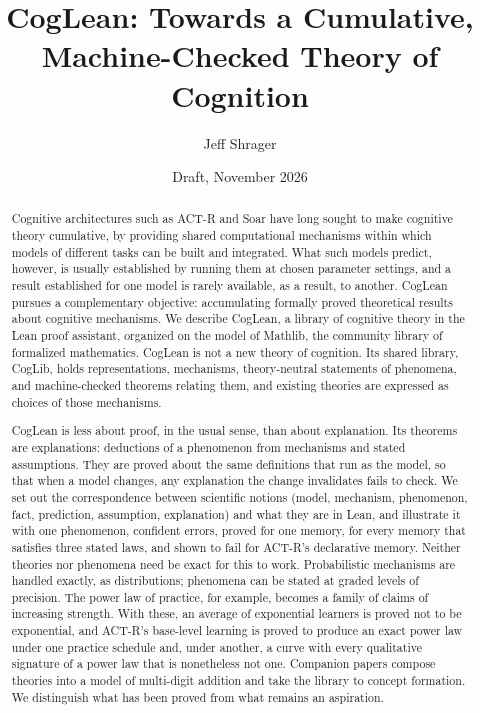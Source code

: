 \documentclass[11pt]{article}
\title{CogLean: Towards a Cumulative, Machine-Checked Theory of Cognition}
\author{Jeff Shrager}
\date{Draft, November 2026}
\begin{document}
\sloppy
\maketitle

\begin{center}
\end{center}
\medskip

\begin{abstract}
Cognitive architectures such as ACT-R and Soar have long sought to make cognitive theory cumulative, by providing shared computational mechanisms within which models of different tasks can be built and integrated. What such models predict, however, is usually established by running them at chosen parameter settings, and a result established for one model is rarely available, as a result, to another. CogLean pursues a complementary objective: accumulating formally proved theoretical results about cognitive mechanisms. We describe CogLean, a library of cognitive theory in the Lean proof assistant, organized on the model of Mathlib, the community library of formalized mathematics. CogLean is not a new theory of cognition. Its shared library, CogLib, holds representations, mechanisms, theory-neutral statements of phenomena, and machine-checked theorems relating them, and existing theories are expressed as choices of those mechanisms.

CogLean is less about proof, in the usual sense, than about explanation. Its theorems are explanations: deductions of a phenomenon from mechanisms and stated assumptions. They are proved about the same definitions that run as the model, so that when a model changes, any explanation the change invalidates fails to check. We set out the correspondence between scientific notions (model, mechanism, phenomenon, fact, prediction, assumption, explanation) and what they are in Lean, and illustrate it with one phenomenon, confident errors, proved for one memory, for every memory that satisfies three stated laws, and shown to fail for ACT-R's declarative memory. Neither theories nor phenomena need be exact for this to work. Probabilistic mechanisms are handled exactly, as distributions; phenomena can be stated at graded levels of precision. The power law of practice, for example, becomes a family of claims of increasing strength. With these, an average of exponential learners is proved not to be exponential, and ACT-R's base-level learning is proved to produce an exact power law under one practice schedule and, under another, a curve with every qualitative signature of a power law that is nonetheless not one. Companion papers compose theories into a model of multi-digit addition and take the library to concept formation. We distinguish what has been proved from what remains an aspiration.
\end{abstract}
\end{document}
